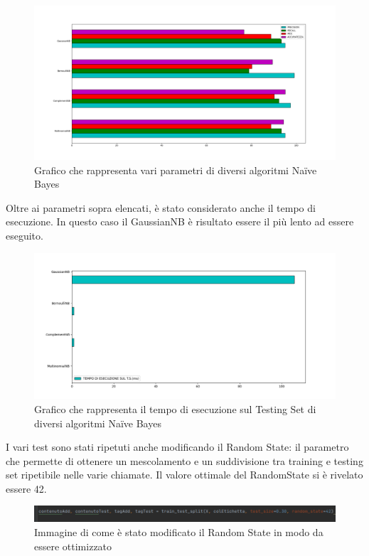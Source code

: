 \documentclass{report}
\begin{document}
  
        \begin{figure}[h!]
            \centering
            \includegraphics[width =\textwidth]{immagini/graficoBuono.png}
            \caption{Grafico che rappresenta vari parametri di diversi algoritmi Naïve Bayes}

        \end{figure}
        Oltre ai parametri sopra elencati, è stato considerato anche il tempo di esecuzione.
        In questo caso il GaussianNB è risultato essere il più lento ad essere eseguito.
        \begin{figure}[h!]
            \centering
            \includegraphics[width =\textwidth]{immagini/graficoEsecuzione.png}
            \caption{Grafico che rappresenta il tempo di esecuzione sul Testing Set di diversi algoritmi Naïve Bayes}

        \end{figure}

    I vari test sono stati ripetuti anche modificando il Random State: il parametro che permette di ottenere un mescolamento e 
    un suddivisione tra training e testing set ripetibile nelle varie chiamate.
    Il valore ottimale del RandomState si è rivelato essere 42.
    

    \begin{figure}[h!]
            \centering
            \includegraphics[width =\textwidth]{immagini/randomState.png}
            \caption{Immagine di come è stato modificato il Random State in modo da essere ottimizzato}

    \end{figure}
\end{document}
